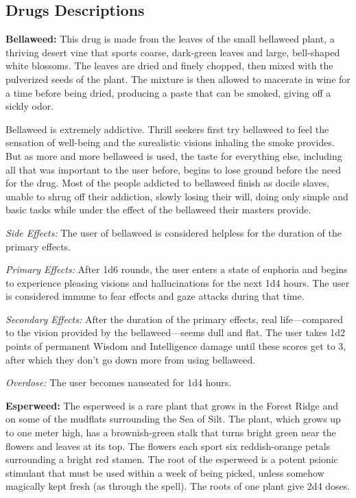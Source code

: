 \subsection{Drugs Descriptions}

\textbf{Bellaweed:} This drug is made from the leaves of the small bellaweed plant, a thriving desert vine that sports coarse, dark-green leaves and large, bell-shaped white blossoms. The leaves are dried and finely chopped, then mixed with the pulverized seeds of the plant. The mixture is then allowed to macerate in wine for a time before being dried, producing a paste that can be smoked, giving off a sickly odor.

Bellaweed is extremely addictive. Thrill seekers first try bellaweed to feel the sensation of well-being and the surealistic visions inhaling the smoke provides. But as more and more bellaweed is used, the taste for everything else, including all that was important to the user before, begins to lose ground before the need for the drug. Most of the people addicted to bellaweed finish as docile slaves, unable to shrug off their addiction, slowly losing their will, doing only simple and basic tasks while under the effect of the bellaweed their masters provide.

\textit{Side Effects:} The user of bellaweed is considered helpless for the duration of the primary effects.

\textit{Primary Effects:} After 1d6 rounds, the user enters a state of euphoria and begins to experience pleasing visions and hallucinations for the next 1d4 hours. The user is considered immune to fear effects and gaze attacks during that time.

\textit{Secondary Effects:} After the duration of the primary effects, real life---compared to the vision provided by the bellaweed---seems dull and flat. The user takes 1d2 points of permanent Wisdom and Intelligence damage until these scores get to 3, after which they don't go down more from using bellaweed.

\textit{Overdose:} The user becomes nauseated for 1d4 hours.

\textbf{Esperweed:} The esperweed is a rare plant that grows in the Forest Ridge and on some of the mudflats surrounding the Sea of Silt. The plant, which grows up to one meter high, has a brownish-green stalk that turns bright green near the flowers and leaves at its top. The flowers each sport six reddish-orange petals surrounding a bright red stamen. The root of the esperweed is a potent psionic stimulant that must be used within a week of being picked, unless somehow magically kept fresh (as through the  spell). The roots of one plant give 2d4 doses.

